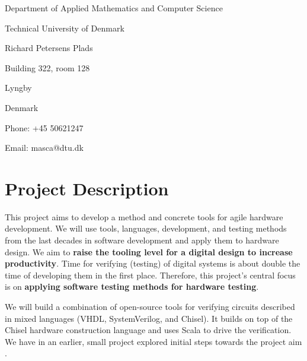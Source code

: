 \documentclass[fleqn,12pt]{article}
\begin{document}
\noindent Department of Applied Mathematics and Computer Science

\noindent Technical University of Denmark

\noindent Richard Petersens Plads

\noindent Building 322, room 128

 Lyngby

\noindent Denmark

\bigskip


\noindent Phone: +45 50621247

\noindent Email: masca@dtu.dk


\newpage
\section*{Project Description}


This project aims to develop a method and concrete tools for agile hardware development.
We will use tools, languages, development, and testing methods from the last decades in
software development and apply them to hardware design.
We aim to {\bf raise the tooling level for a digital design to increase productivity}.
Time for verifying (testing) of digital systems is about double the time of developing
them in the first place.
Therefore, this project's central focus is on {\bf applying software
testing methods for hardware testing}.

We will build a combination of open-source tools for verifying
circuits described in mixed languages (VHDL, SystemVerilog, and Chisel).
It builds on top of the Chisel hardware construction language and uses Scala to drive the verification.
We have in an earlier, small project explored initial steps towards
the project aim \cite{verify:chisel:2020}.


\end{document}
